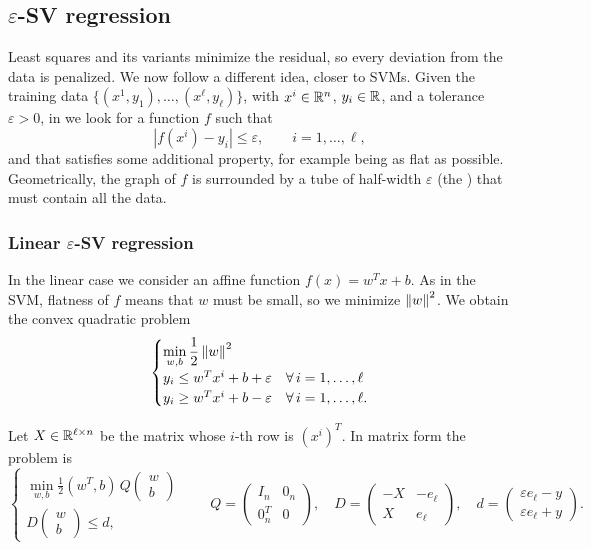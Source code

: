 \subsection{$\varepsilon$-SV regression}

Least squares and its variants minimize the residual, so every deviation from the data is penalized. We now follow a different idea, closer to SVMs. Given the training data $\{(x^1,y_1),\dots,(x^\ell,y_\ell)\}$, with $x^i \in \mathbb{R}^n$, $y_i \in \mathbb{R}$, and a tolerance $\varepsilon > 0$, in  we look for a function $f$ such that
\[
|f(x^i) - y_i| \le \varepsilon, \qquad i=1,\dots,\ell,
\]
and that satisfies some additional property, for example being as flat as possible. Geometrically, the graph of $f$ is surrounded by a tube of half-width $\varepsilon$ (the ) that must contain all the data.

\subsubsection{Linear $\varepsilon$-SV regression}

In the linear case we consider an affine function $f(x) = w^Tx + b$. As in the SVM, flatness of $f$ means that $w$ must be small, so we minimize $\left\lVert w \right\rVert^2$. We obtain the convex quadratic problem
\begin{equation}\label{eq:svr}
\begin{cases}
\displaystyle \min_{w,b} \frac{1}{2}\left\lVert w \right\rVert^2\\[1ex]
y_i \le w^Tx^i + b + \varepsilon & \forall\, i=1,\dots,\ell\\
y_i \ge w^Tx^i + b - \varepsilon & \forall\, i=1,\dots,\ell.
\end{cases}
\end{equation}

Let $X \in \mathbb{R}^{\ell\times n}$ be the matrix whose $i$-th row is $(x^i)^T$. In matrix form the problem is
\[
\begin{cases}
\displaystyle \min_{w,b} \frac{1}{2}(w^T, b)\,Q\begin{pmatrix} w\\ b \end{pmatrix}\\[1ex]
D\begin{pmatrix} w\\ b \end{pmatrix} \le d,
\end{cases}
\qquad
Q = \begin{pmatrix} I_n & 0_n\\ 0_n^T & 0 \end{pmatrix},\quad
D = \begin{pmatrix} -X & -e_\ell\\ X & e_\ell \end{pmatrix},\quad
d = \begin{pmatrix} \varepsilon e_\ell - y\\ \varepsilon e_\ell + y \end{pmatrix}.
\]

